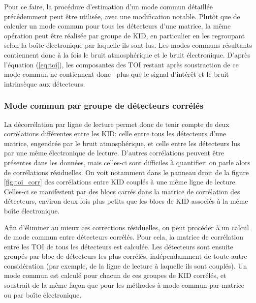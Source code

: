 Pour ce faire, la procédure d'estimation d'un mode commun détaillée précédemment peut être utilisée, avec une modification notable.
Plutôt que de calculer un mode commun pour tous les détecteurs d'une matrice, la même opération peut être réalisée par groupe de KID, en particulier en les regroupant selon la boîte électronique par laquelle ils sont lus.
Les modes communs résultants contiennent donc à la fois le bruit atmosphérique et le bruit électronique.
D'après l'équation (\ref{eq:toi}), les composantes des TOI restant après soustraction de ce mode commun ne contiennent donc \prior\ plus que le signal d'intérêt et le bruit intrinsèque aux détecteurs.

\subsubsection{Mode commun par groupe de détecteurs corrélés} %
La décorrélation par ligne de lecture permet donc de tenir compte de deux corrélations différentes entre les KID: celle entre tous les détecteurs d'une matrice, engendrée par le bruit atmosphérique, et celle entre les détecteurs lus par une même électronique de lecture.
D'autres corrélations peuvent être présentes dans les données, mais celles-ci sont difficiles à quantifier: on parle alors de corrélations résiduelles.
On voit notamment dans le panneau droit de la figure \ref{fig:toi_corr} des corrélations entre KID couplés à une même ligne de lecture.
Celles-ci se manifestent par des blocs carrés dans la matrice de corrélation des détecteurs, environ deux fois plus petits que les blocs de KID associés à la même boîte électronique.

Afin d'éliminer au mieux ces corrections résiduelles, on peut procéder à un calcul de mode commun entre détecteurs corrélés.
Pour cela, la matrice de corrélation entre les TOI de tous les détecteurs est calculée.
Les détecteurs sont ensuite groupés par bloc de détecteurs les plus corrélés, indépendamment de toute autre considération (par exemple, de la ligne de lecture à laquelle ils sont couplés).
Un mode commun est calculé pour chacun de ces groupes de KID corrélés, et soustrait de la même façon que pour les méthodes à mode commun par matrice ou par boîte électronique.

